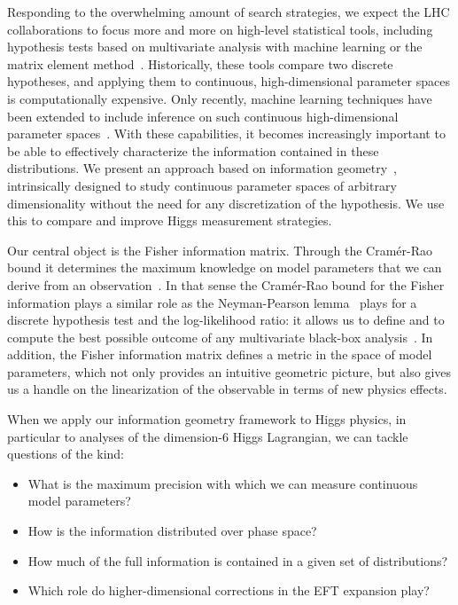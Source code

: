 Responding to the overwhelming amount of search strategies, we expect
the LHC collaborations to focus more and more on high-level
statistical tools, including hypothesis tests based on multivariate
analysis with machine learning or the matrix element
method~\cite{statistics,kyle_review}. Historically, these tools
compare two discrete hypotheses, and applying them to continuous,
high-dimensional parameter spaces is computationally expensive.  Only
recently, machine learning techniques have been extended to include
inference on such continuous high-dimensional parameter
spaces~\cite{machine_learning}.  With these capabilities, it becomes
increasingly important to be able to effectively characterize the
information contained in these distributions.  We present an approach
based on information geometry~\cite{information-geometry},
intrinsically designed to study continuous parameter spaces of
arbitrary dimensionality without the need for any discretization of
the hypothesis. We use this to compare and improve Higgs measurement
strategies.

Our central object is the Fisher information matrix. Through the
Cram\'er-Rao bound it determines the maximum knowledge on model
parameters that we can derive from an
observation~\cite{cramer-rao,information-applications}. In that sense the
Cram\'er-Rao bound for the Fisher information plays a similar role as
the Neyman-Pearson lemma~\cite{neyman-pearson} plays for a discrete
hypothesis test and the log-likelihood ratio: it allows us to define
and to compute the best possible outcome of any multivariate black-box
analysis~\cite{kyle_review,madmax1}. In addition, the Fisher
information matrix defines a metric in the space of model parameters,
which not only provides an intuitive geometric picture, but also gives
us a handle on the linearization of the observable in terms of new
physics effects.

When we apply our information geometry framework to Higgs physics, in
particular to analyses of the dimension-6 Higgs Lagrangian, we can
tackle questions of the kind:
%
\begin{itemize}[label=\raisebox{0.1ex}{\scriptsize$\bullet$}]
\item What is the maximum precision with which we can measure
  continuous model parameters?
\item How is the information distributed over phase space?
\item How much of the full information is contained in a given set of
  distributions?
\item Which role do higher-dimensional corrections in the EFT
  expansion play?
\end{itemize}
%


